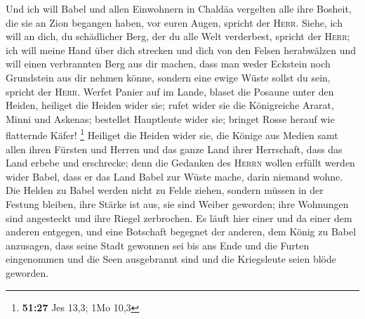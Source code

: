  Und ich will Babel und allen Einwohnern in Chaldäa
vergelten alle ihre Bosheit, die sie an Zion begangen haben, vor euren
Augen, spricht der \textsc{Herr}.  Siehe, ich will an
dich, du schädlicher Berg, der du alle Welt verderbest, spricht der
\textsc{Herr}; ich will meine Hand über dich strecken und dich von den
Felsen herabwälzen und will einen verbrannten Berg aus dir machen,
 dass man weder Eckstein noch Grundstein aus dir nehmen
könne, sondern eine ewige Wüste sollst du sein, spricht der
\textsc{Herr}.  Werfet Panier auf im Lande, blaset die
Posaune unter den Heiden, heiliget die Heiden wider sie; rufet wider sie
die Königreiche Ararat, Minni und Askenas; bestellet Hauptleute wider
sie; bringet Rosse herauf wie flatternde Käfer! \footnote{\textbf{51:27}
  Jes 13,3; 1Mo 10,3}  Heiliget die Heiden wider sie, die
Könige aus Medien samt allen ihren Fürsten und Herren und das ganze Land
ihrer Herrschaft,  dass das Land erbebe und erschrecke;
denn die Gedanken des \textsc{Herrn} wollen erfüllt werden wider Babel,
dass er das Land Babel zur Wüste mache, darin niemand wohne.
 Die Helden zu Babel werden nicht zu Felde ziehen,
sondern müssen in der Festung bleiben, ihre Stärke ist aus, sie sind
Weiber geworden; ihre Wohnungen sind angesteckt und ihre Riegel
zerbrochen.  Es läuft hier einer und da einer dem anderen
entgegen, und eine Botschaft begegnet der anderen, dem König zu Babel
anzusagen, dass seine Stadt gewonnen sei bis ans Ende 
und die Furten eingenommen und die Seen ausgebrannt sind und die
Kriegsleute seien blöde geworden.


